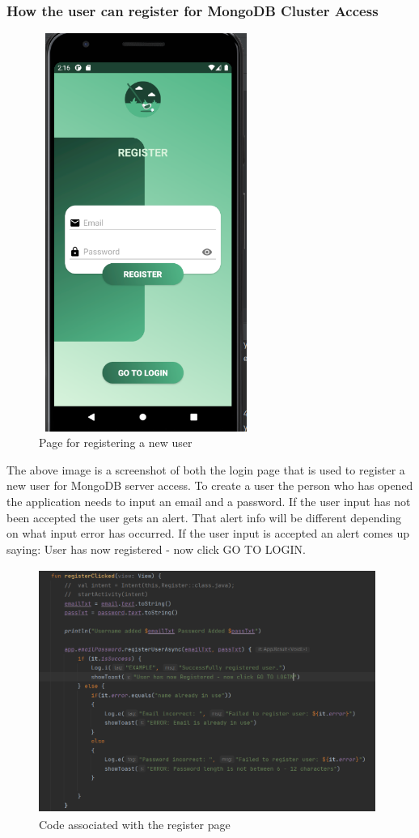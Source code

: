 \subsubsection{How the user can register for MongoDB Cluster Access}
\begin{figure}[H]
    \centering
    \includegraphics[width=7cm, height = 13cm]{img/registerPage.PNG}
    \caption{Page for registering a new user}
    \label{fig:altas config}
\end{figure}
The above image is a screenshot of both the login page that is used to register a new user for MongoDB server access. To create a user the person who has opened the application needs to input an email and a password. If the user input has not been accepted the user gets an alert. That alert info will be different depending on what input error has occurred. If the user input is accepted an alert comes up saying: User has now registered - now click GO TO LOGIN.
\begin{figure}[H]
    \centering
    \includegraphics[width=11cm, height= 8cm]{img/registerCode.PNG}
    \caption{Code associated with the register page}
    \label{fig:altas config}
\end{figure}
